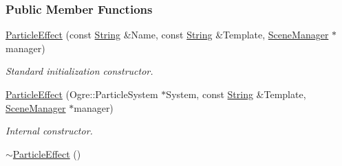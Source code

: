 \subsubsection*{Public Member Functions}
\begin{DoxyCompactItemize}
\item 
\hyperlink{classphys_1_1ParticleEffect_a42d17b7cd81968603c70920c30e6f812}{ParticleEffect} (const \hyperlink{namespacephys_aa03900411993de7fbfec4789bc1d392e}{String} \&Name, const \hyperlink{namespacephys_aa03900411993de7fbfec4789bc1d392e}{String} \&Template, \hyperlink{classphys_1_1SceneManager}{SceneManager} $\ast$manager)
\begin{DoxyCompactList}\small\item\em Standard initialization constructor. \item\end{DoxyCompactList}\item 
\hyperlink{classphys_1_1ParticleEffect_aaf5a40f8c22ca3cd01f0feeb08b8308b}{ParticleEffect} (Ogre::ParticleSystem $\ast$System, const \hyperlink{namespacephys_aa03900411993de7fbfec4789bc1d392e}{String} \&Template, \hyperlink{classphys_1_1SceneManager}{SceneManager} $\ast$manager)
\begin{DoxyCompactList}\small\item\em Internal constructor. \item\end{DoxyCompactList}\item 
\hypertarget{classphys_1_1ParticleEffect_a8c9c3d0cd1d02acdc626266ee485f51f}{
\hyperlink{classphys_1_1ParticleEffect_a8c9c3d0cd1d02acdc626266ee485f51f}{$\sim$ParticleEffect} ()}
\label{classphys_1_1ParticleEffect_a8c9c3d0cd1d02acdc626266ee485f51f}


\end{DoxyCompactItemize}
